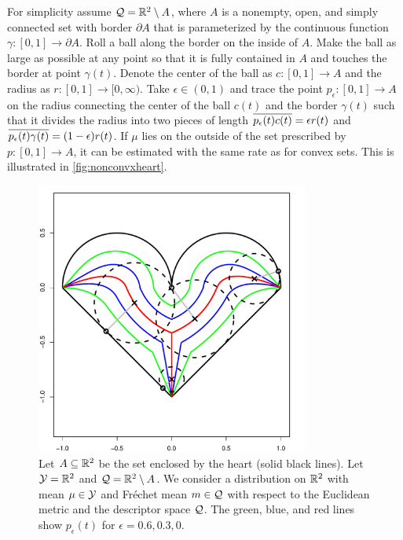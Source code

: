 	For simplicity assume $\mathcal{Q} = \mathbb{R}^2 \setminus A$, where $A$ is a nonempty, open, and simply connected set with border $\partial A$ that is parameterized by the continuous function $\gamma\colon[0,1] \to \partial A$. Roll a ball along the border on the inside of $A$. Make the ball as large as possible at any point so that it is fully contained in $A$ and touches the border at point $\gamma(t)$. Denote the center of the ball as $c \colon [0,1]\to A$ and the radius as $r \colon [0,1] \to [0,\infty)$. Take $\epsilon\in(0,1)$ and trace the point $p_\epsilon\colon[0,1]\to A$ on the radius connecting the center of the ball $c(t)$ and the border $\gamma(t)$ such that it divides the radius into two pieces of length $\overline{p_\epsilon(t)c(t)} = \epsilon r(t)$ and $\overline{p_\epsilon(t)\gamma(t)} =(1-\epsilon) r(t)$. If $\mu$ lies on the outside of the set prescribed by $p\colon[0,1]\to A$, it can be estimated with the same rate as for convex sets.
	This is illustrated in \autoref{fig:nonconvxheart}.
	\begin{figure}
		\begin{center}
			\includegraphics[width=0.8\textwidth]{nonconvex_heart.pdf}
		\end{center}
		\caption{Let $A\subseteq\mathbb{R}^2$ be the set enclosed by the heart (solid black lines). Let $\mathcal{Y} = \mathbb{R}^2$ and $\mathcal{Q} = \mathbb{R}^2 \setminus A$. We consider a distribution on $\mathbb{R}^2$ with mean $\mu\in\mathcal{Y}$ and Fréchet mean $m\in\mathcal{Q}$ with respect to the Euclidean metric and the descriptor space $\mathcal{Q}$. The green, blue, and red lines show $p_\epsilon(t)$ for $\epsilon = 0.6, 0.3, 0$.}\label{fig:nonconvxheart}
	\end{figure}
